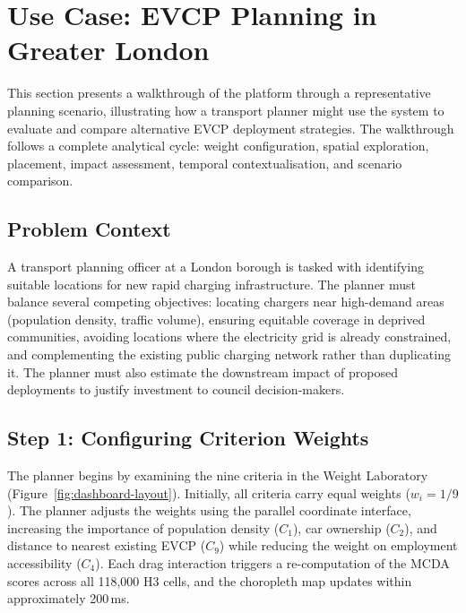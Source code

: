 
\section{Use Case: EVCP Planning in Greater London}
\label{sec:use-case}

This section presents a walkthrough of the platform through a representative planning scenario, illustrating how a transport planner might use the system to evaluate and compare alternative EVCP deployment strategies. The walkthrough follows a complete analytical cycle: weight configuration, spatial exploration, placement, impact assessment, temporal contextualisation, and scenario comparison.

\subsection{Problem Context}
\label{sec:problem-context}

A transport planning officer at a London borough is tasked with identifying suitable locations for new rapid charging infrastructure. The planner must balance several competing objectives: locating chargers near high-demand areas (population density, traffic volume), ensuring equitable coverage in deprived communities, avoiding locations where the electricity grid is already constrained, and complementing the existing public charging network rather than duplicating it. The planner must also estimate the downstream impact of proposed deployments to justify investment to council decision-makers.

\subsection{Step 1: Configuring Criterion Weights}
\label{sec:uc-weights}

The planner begins by examining the nine criteria in the Weight Laboratory (Figure~\ref{fig:dashboard-layout}). Initially, all criteria carry equal weights ($w_i = 1/9$). The planner adjusts the weights using the parallel coordinate interface, increasing the importance of population density ($C_1$), car ownership ($C_2$), and distance to nearest existing EVCP ($C_9$) while reducing the weight on employment accessibility ($C_4$). Each drag interaction triggers a re-computation of the MCDA scores across all 118,000 H3 cells, and the choropleth map updates within approximately 200\,ms.

